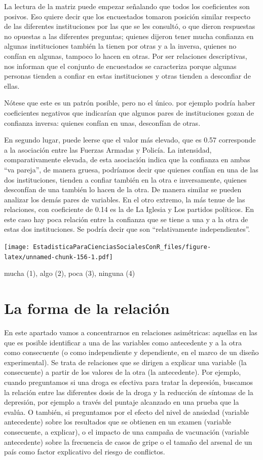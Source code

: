 \documentclass[]{book}
\begin{document}
La lectura de la matriz puede empezar señalando que todos los coeficientes son posivos. Eso quiere decir que los encuestados tomaron posición similar respecto de las diferentes instituciones por las que se les consultó, o que dieron respuestas no opuestas a las diferentes preguntas; quienes dijeron tener mucha confianza en algunas instituciones también la tienen por otras y a la inversa, quienes no confían en algunas, tampoco lo hacen en otras. Por ser relaciones descriptivas, nos informan que el conjunto de encuestados se caracteriza porque algunas personas tienden a confiar en estas instituciones y otras tienden a desconfiar de ellas.

Nótese que este es un patrón posible, pero no el único. por ejemplo podría haber coeficientes negativos que indicarían que algunos pares de instituciones gozan de confianza inversa: quienes confían en unas, desconfían de otras.

En segundo lugar, puede leerse que el valor más elevado, que es 0.57 corresponde a la asociación entre las Fuerzas Armadas y Policía. La intensidad, comparativamente elevada, de esta asociación indica que la confianza en ambas ``va pareja'', de manera gruesa, podríamos decir que quienes confían en una de las dos instituciones, tienden a confiar también en la otra e inversamente, quienes desconfían de una también lo hacen de la otra. De manera similar se pueden analizar los demás pares de variables.
En el otro extremo, la más tenue de las relaciones, con coeficiente de 0.14 es la de La Iglesia y Los partidos políticos. En este caso hay poca relación entre la confianza que se tiene a una y a la otra de estas dos instituciones. Se podría decir que son ``relativamente independientes''.

\texttt{[image: EstadisticaParaCienciasSocialesConR\_files/figure-latex/unnamed-chunk-156-1.pdf]}

mucha (1), algo (2), poca (3), ninguna (4)

\hypertarget{la-forma-de-la-relacion}{%
\section{La forma de la relación}\label{la-forma-de-la-relacion}}

En este apartado vamos a concentrarnos en relaciones asimétricas: aquellas en las que es posible identificar a una de las variables como antecedente y a la otra como consecuente (o como independiente y
dependiente, en el marco de un diseño experimental). Se trata de
relaciones que se dirigen a explicar una variable (la consecuente) a
partir de los valores de la otra (la antecedente). Por ejemplo, cuando preguntamos si una droga es efectiva para tratar la depresión, buscamos la relación entre las diferentes dosis de la droga y la reducción de síntomas de la depresión, por ejemplo a través del puntaje alcanzado en una prueba que la evalúa. O también, si preguntamos por el efecto del nivel de ansiedad (variable antecedente) sobre los resultados que se obtienen en un examen (variable consecuente, a explicar), o el impacto de una campaña de vacunación (variable antecedente) sobre la frecuencia de casos de gripe o el tamaño del arsenal de un país como factor explicativo del riesgo de conflictos.
\end{document}

